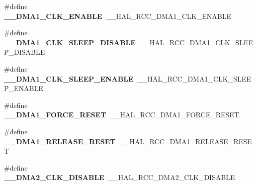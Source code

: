 \begin{DoxyCompactItemize}
\item 
\mbox{\label{group___h_a_l___r_c_c___aliased_gab7bc4cf6efeb1ea610682993cea17995}} 
\#define {\bfseries \+\_\+\+\_\+\+D\+M\+A1\+\_\+\+C\+L\+K\+\_\+\+E\+N\+A\+B\+LE}~\+\_\+\+\_\+\+H\+A\+L\+\_\+\+R\+C\+C\+\_\+\+D\+M\+A1\+\_\+\+C\+L\+K\+\_\+\+E\+N\+A\+B\+LE
\item 
\mbox{\label{group___h_a_l___r_c_c___aliased_ga78df1bf8400fee8e98d8ba43312bdc5e}} 
\#define {\bfseries \+\_\+\+\_\+\+D\+M\+A1\+\_\+\+C\+L\+K\+\_\+\+S\+L\+E\+E\+P\+\_\+\+D\+I\+S\+A\+B\+LE}~\+\_\+\+\_\+\+H\+A\+L\+\_\+\+R\+C\+C\+\_\+\+D\+M\+A1\+\_\+\+C\+L\+K\+\_\+\+S\+L\+E\+E\+P\+\_\+\+D\+I\+S\+A\+B\+LE
\item 
\mbox{\label{group___h_a_l___r_c_c___aliased_ga38e380cb1fa25bab0fe185f9dc8a1c03}} 
\#define {\bfseries \+\_\+\+\_\+\+D\+M\+A1\+\_\+\+C\+L\+K\+\_\+\+S\+L\+E\+E\+P\+\_\+\+E\+N\+A\+B\+LE}~\+\_\+\+\_\+\+H\+A\+L\+\_\+\+R\+C\+C\+\_\+\+D\+M\+A1\+\_\+\+C\+L\+K\+\_\+\+S\+L\+E\+E\+P\+\_\+\+E\+N\+A\+B\+LE
\item 
\mbox{\label{group___h_a_l___r_c_c___aliased_ga1b49adf6ce960db1fc3e97c015904a4e}} 
\#define {\bfseries \+\_\+\+\_\+\+D\+M\+A1\+\_\+\+F\+O\+R\+C\+E\+\_\+\+R\+E\+S\+ET}~\+\_\+\+\_\+\+H\+A\+L\+\_\+\+R\+C\+C\+\_\+\+D\+M\+A1\+\_\+\+F\+O\+R\+C\+E\+\_\+\+R\+E\+S\+ET
\item 
\mbox{\label{group___h_a_l___r_c_c___aliased_ga30b3a917fca9f9ea9004c310ed3cefe6}} 
\#define {\bfseries \+\_\+\+\_\+\+D\+M\+A1\+\_\+\+R\+E\+L\+E\+A\+S\+E\+\_\+\+R\+E\+S\+ET}~\+\_\+\+\_\+\+H\+A\+L\+\_\+\+R\+C\+C\+\_\+\+D\+M\+A1\+\_\+\+R\+E\+L\+E\+A\+S\+E\+\_\+\+R\+E\+S\+ET
\item 
\mbox{\label{group___h_a_l___r_c_c___aliased_ga3666b12e99818df90eca5d8c53376d0f}} 
\#define {\bfseries \+\_\+\+\_\+\+D\+M\+A2\+\_\+\+C\+L\+K\+\_\+\+D\+I\+S\+A\+B\+LE}~\+\_\+\+\_\+\+H\+A\+L\+\_\+\+R\+C\+C\+\_\+\+D\+M\+A2\+\_\+\+C\+L\+K\+\_\+\+D\+I\+S\+A\+B\+LE
\item 
\mbox{\label{group___h_a_l___r_c_c___aliased_gac2d5e13fd9b6bf9608a8fdba50558dce}} 

\end{DoxyCompactItemize}
